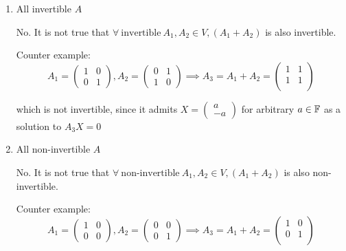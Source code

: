\documentclass[a4paper, 10pt]{article}
\begin{document}
\begin{solution}
    \begin{enumerate}
        \item All invertible \(A\)

              No. It is not true that \(\forall \:\text{invertible}\: A_1, A_2 \in V, (A_1 + A_2)\) is also invertible.

              Counter example: \[
                  A_1 = \begin{pmatrix}
                          1 & 0 \\
                          0 & 1
                      \end{pmatrix}, A_2 = \begin{pmatrix}
                          0 & 1 \\
                          1 & 0
                      \end{pmatrix} \implies A_3 = A_1 + A_2 = \begin{pmatrix}
                          1 & 1 \\
                          1 & 1 \\
                      \end{pmatrix}
              \]

              which is not invertible, since it admits \(X = \begin{pmatrix}
                      a \\ -a
                  \end{pmatrix}\) for arbitrary \(a \in \mathbb{F}\) as a solution to \(A_3X = 0\)

        \item All non-invertible \(A\)

              No. It is not true that \(\forall \:\text{non-invertible}\: A_1, A_2 \in V, (A_1 + A_2)\) is also non-invertible.

              Counter example: \[
                  A_1 = \begin{pmatrix}
                          1 & 0 \\
                          0 & 0
                      \end{pmatrix}, A_2 = \begin{pmatrix}
                          0 & 0 \\
                          0 & 1
                      \end{pmatrix} \implies A_3 = A_1 + A_2 = \begin{pmatrix}
                          1 & 0 \\
                          0 & 1 \\
                      \end{pmatrix}
              \]


\end{enumerate}
\end{solution}
\end{document}
